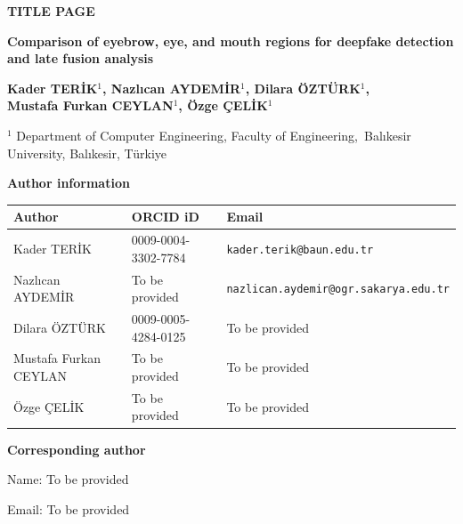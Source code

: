 \documentclass[11pt,a4paper]{article}
\begin{document}
\textbf{TITLE PAGE}\par\vspace{15pt}
\begin{center}{\Large\bfseries Comparison of eyebrow, eye, and mouth regions for deepfake detection and late fusion analysis\par}\vspace{18pt}
{\bfseries Kader TERİK$^{1}$, Nazlıcan AYDEMİR$^{1}$, Dilara ÖZTÜRK$^{1}$,\\ Mustafa Furkan CEYLAN$^{1}$, Özge ÇELİK$^{1}$\par}\vspace{14pt}
$^{1}$ Department of Computer Engineering, Faculty of Engineering,\ Balıkesir University, Balıkesir, Türkiye
\end{center}\vspace{15pt}
\textbf{Author information}\par
\small\begin{tabular}{@{}p{3.8cm}p{4.0cm}p{7.3cm}@{}}\toprule
Author & ORCID iD & Email\\\midrule
Kader TERİK & 0009-0004-3302-7784 & \nolinkurl{kader.terik@baun.edu.tr}\\[12pt]
Nazlıcan AYDEMİR & To be provided & \nolinkurl{nazlican.aydemir@ogr.sakarya.edu.tr}\\[12pt]
Dilara ÖZTÜRK & 0009-0005-4284-0125 & To be provided\\[12pt]
Mustafa Furkan CEYLAN & To be provided & To be provided\\[12pt]
Özge ÇELİK & To be provided & To be provided\\[12pt]
\bottomrule\end{tabular}\normalsize\par\vspace{24pt}
\textbf{Corresponding author}\par
Name: To be provided\par
Email: To be provided
\end{document}
